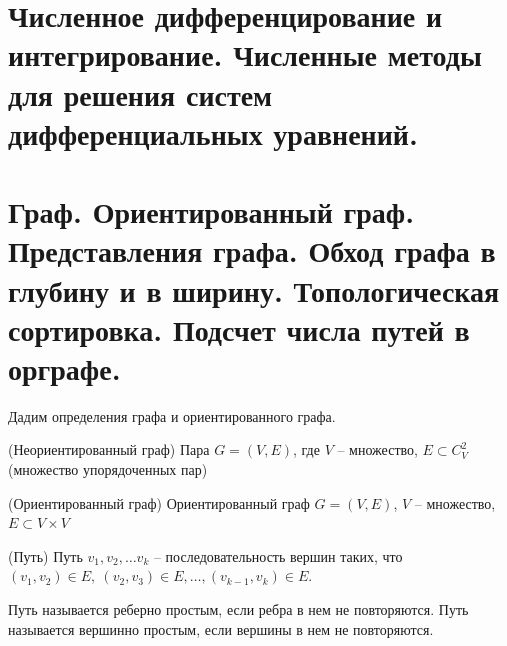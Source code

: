 \begin{multicols}{2}
    \section{Численное дифференцирование и интегрирование. Численные методы для решения
    систем дифференциальных уравнений.}

    \section{Граф. Ориентированный граф. Представления графа. Обход графа в глубину и в ширину.
    Топологическая сортировка. Подсчет числа путей в орграфе.}
    Дадим определения графа и ориентированного графа.
    \begin{definition}{(Неориентированный граф)}{}
        Пара $G= (V,E)$, где $V$ -- множество, $E \subset C_V^2$ (множество упорядоченных пар)
    \end{definition}
    \begin{definition}{(Ориентированный граф)}{}
        Ориентированный граф $G= (V,E)$, $V$ -- множество, $E\subset V\times V$
    \end{definition}
    \begin{definition}{(Путь)}{}
        Путь $v_1, v_2, \ldots v_k$ -- последовательность вершин таких, что $(v_1, v_2) \in E, \ (v_2, v_3) \in E, \ldots , (v_{k-1}, v_{k}) \in E$.
    \end{definition}
    Путь называется реберно простым, если ребра в нем не повторяются. Путь называется вершинно простым, если вершины в нем не повторяются. \vspace*{0.5cm}


\end{multicols}
